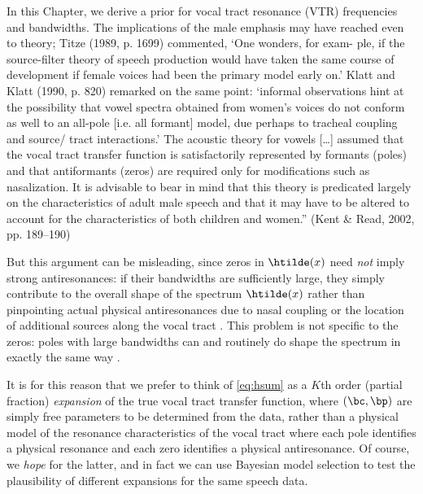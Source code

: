 \begin{chaptersections}{%
In this Chapter, we derive a prior for vocal tract resonance (VTR) frequencies and bandwidths.
}
The implications of the male emphasis may have reached even
to theory; Titze (1989, p. 1699) commented, ‘One wonders, for exam-
ple, if the source-filter theory of speech production would have taken
the same course of development if female voices had been the primary
model early on.’ Klatt and Klatt (1990, p. 820) remarked on the same
point: ‘informal observations hint at the possibility that vowel spectra
obtained from women’s voices do not conform as well to an all-pole
[i.e. all formant] model, due perhaps to tracheal coupling and source/
tract interactions.’ The acoustic theory for vowels […] assumed that the
vocal tract transfer function is satisfactorily represented by formants
(poles) and that antiformants (zeros) are required only for modifications
such as nasalization. It is advisable to bear in mind that this theory is
predicated largely on the characteristics of adult male speech and that
it may have to be altered to account for the characteristics of both
children and women.” (Kent \& Read, 2002, pp. 189–190) \citep[][p.~126]{Maurer2016}


But this argument can be misleading, since zeros in $\htilde(x)$ need \emph{not} imply strong antiresonances: if their bandwidths are sufficiently large, they simply contribute to the overall shape of the spectrum $\htilde(x)$ rather than pinpointing actual physical antiresonances due to nasal coupling or the location of additional sources along the vocal tract \citep{Peterson1966}.
This problem is not specific to the zeros: poles with large bandwidths can and routinely do shape the spectrum in exactly the same way \citep[][p.~177]{Fulop2011}.

It is for this reason that we prefer to think of \eqref{eq:hsum} as a $K$th order (partial fraction) \emph{expansion} of the true vocal tract transfer function, where $(\bc,\bp)$ are simply free parameters to be determined from the data, rather than a physical model of the resonance characteristics of the vocal tract where each pole identifies a physical resonance and each zero identifies a physical antiresonance.
Of course, we \emph{hope} for the latter, and in fact we can use Bayesian model selection to test the plausibility of different expansions for the same speech data.


\end{chaptersections}
